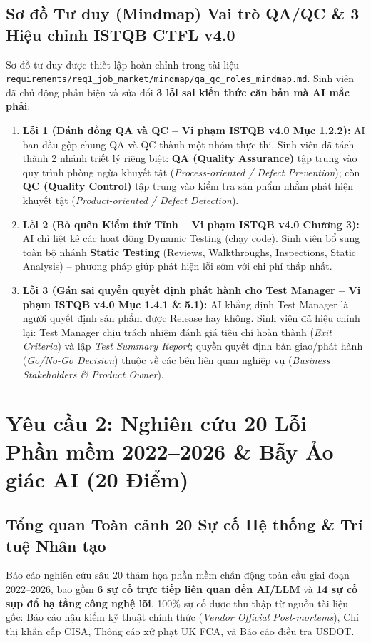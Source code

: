\documentclass[11pt,a4paper]{article}
\newcommand{\filepath}[1]{\nolinkurl{#1}}
\begin{document}
\subsection{Sơ đồ Tư duy (Mindmap) Vai trò QA/QC \& 3 Hiệu chỉnh ISTQB CTFL v4.0}
Sơ đồ tư duy được thiết lập hoàn chỉnh trong tài liệu \filepath{requirements/req1_job_market/mindmap/qa_qc_roles_mindmap.md}. Sinh viên đã chủ động phản biện và sửa đổi \textbf{3 lỗi sai kiến thức căn bản mà AI mắc phải}:
\begin{enumerate}
    \item \textbf{Lỗi 1 (Đánh đồng QA và QC -- Vi phạm ISTQB v4.0 Mục 1.2.2):} AI ban đầu gộp chung QA và QC thành một nhóm thực thi. Sinh viên đã tách thành 2 nhánh triết lý riêng biệt: \textbf{QA (Quality Assurance)} tập trung vào quy trình phòng ngừa khuyết tật (\textit{Process-oriented / Defect Prevention}); còn \textbf{QC (Quality Control)} tập trung vào kiểm tra sản phẩm nhằm phát hiện khuyết tật (\textit{Product-oriented / Defect Detection}).
    \item \textbf{Lỗi 2 (Bỏ quên Kiểm thử Tĩnh -- Vi phạm ISTQB v4.0 Chương 3):} AI chỉ liệt kê các hoạt động Dynamic Testing (chạy code). Sinh viên bổ sung toàn bộ nhánh \textbf{Static Testing} (Reviews, Walkthroughs, Inspections, Static Analysis) -- phương pháp giúp phát hiện lỗi sớm với chi phí thấp nhất.
    \item \textbf{Lỗi 3 (Gán sai quyền quyết định phát hành cho Test Manager -- Vi phạm ISTQB v4.0 Mục 1.4.1 \& 5.1):} AI khẳng định Test Manager là người quyết định sản phẩm được Release hay không. Sinh viên đã hiệu chỉnh lại: Test Manager chịu trách nhiệm đánh giá tiêu chí hoàn thành (\textit{Exit Criteria}) và lập \textit{Test Summary Report}; quyền quyết định bàn giao/phát hành (\textit{Go/No-Go Decision}) thuộc về các bên liên quan nghiệp vụ (\textit{Business Stakeholders \& Product Owner}).
\end{enumerate}

\newpage
\section{Yêu cầu 2: Nghiên cứu 20 Lỗi Phần mềm 2022–2026 \& Bẫy Ảo giác AI (20 Điểm)}

\subsection{Tổng quan Toàn cảnh 20 Sự cố Hệ thống \& Trí tuệ Nhân tạo}
Báo cáo nghiên cứu sâu 20 thảm họa phần mềm chấn động toàn cầu giai đoạn 2022--2026, bao gồm \textbf{6 sự cố trực tiếp liên quan đến AI/LLM} và \textbf{14 sự cố sụp đổ hạ tầng công nghệ lõi}. 100\% sự cố được thu thập từ nguồn tài liệu gốc: Báo cáo hậu kiểm kỹ thuật chính thức (\textit{Vendor Official Post-mortems}), Chỉ thị khẩn cấp CISA, Thông cáo xử phạt UK FCA, và Báo cáo điều tra USDOT.
\end{document}
